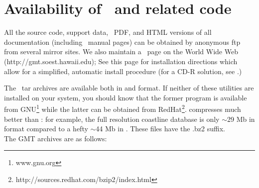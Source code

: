 %
%
\chapter{Availability of \gmt\ and related code}
\label{app:D}
\thispagestyle{headings}

All the source code, support data, \PS\, PDF,
and HTML versions of all documentation (including \UNIX\
manual pages) can be obtained by anonymous
ftp from several mirror sites.  We also maintain a \GMT\
page on the World Wide Web (http://gmt.soest.hawaii.edu);
See this page for installation directions 
which allow for a simplified, automatic install procedure
(for a CD-R solution, see .)

The \GMT\ tar archives are available both in \progname{gzip}
and  format.  If neither of these utilities
are installed on your system, you should know that the former
program is available from GNU\footnote{www.gnu.org} while the
latter can be obtained from RedHat\footnote{http://sources.redhat.com/bzip2/index.html}.
 compresses much better than :
for example, the full resolution coastline database is only
$\sim$29 Mb in \progname{bzip2} format compared to a hefty
$\sim$44 Mb in \progname{gzip}.  These files have the .bz2 suffix. \\

The GMT archives are as follows:

